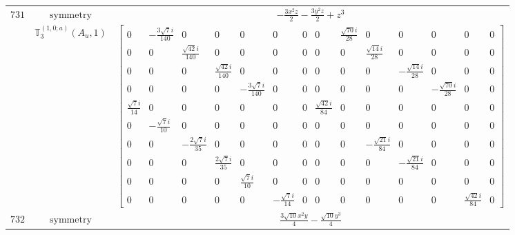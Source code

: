 \documentclass[fleqn,8pt,landscape]{jsarticle}
\begin{document}
\begin{longtable}{ccc}
$ 731 $ & $ \text{symmetry} $ & $ - \frac{3 x^{2} z}{2} - \frac{3 y^{2} z}{2} + z^{3} $ \\
$  $ & $ \mathbb{T}_{3}^{(1,0;a)}(A_{u},1) $ & $ \begin{bmatrix} 0 & - \frac{3 \sqrt{7} i}{140} & 0 & 0 & 0 & 0 & 0 & 0 & \frac{\sqrt{70} i}{28} & 0 & 0 & 0 & 0 & 0 \\ 0 & 0 & \frac{\sqrt{42} i}{140} & 0 & 0 & 0 & 0 & 0 & 0 & \frac{\sqrt{14} i}{28} & 0 & 0 & 0 & 0 \\ 0 & 0 & 0 & \frac{\sqrt{42} i}{140} & 0 & 0 & 0 & 0 & 0 & 0 & - \frac{\sqrt{14} i}{28} & 0 & 0 & 0 \\ 0 & 0 & 0 & 0 & - \frac{3 \sqrt{7} i}{140} & 0 & 0 & 0 & 0 & 0 & 0 & - \frac{\sqrt{70} i}{28} & 0 & 0 \\ \frac{\sqrt{7} i}{14} & 0 & 0 & 0 & 0 & 0 & 0 & \frac{\sqrt{42} i}{84} & 0 & 0 & 0 & 0 & 0 & 0 \\ 0 & - \frac{\sqrt{7} i}{10} & 0 & 0 & 0 & 0 & 0 & 0 & 0 & 0 & 0 & 0 & 0 & 0 \\ 0 & 0 & - \frac{2 \sqrt{7} i}{35} & 0 & 0 & 0 & 0 & 0 & 0 & - \frac{\sqrt{21} i}{84} & 0 & 0 & 0 & 0 \\ 0 & 0 & 0 & \frac{2 \sqrt{7} i}{35} & 0 & 0 & 0 & 0 & 0 & 0 & - \frac{\sqrt{21} i}{84} & 0 & 0 & 0 \\ 0 & 0 & 0 & 0 & \frac{\sqrt{7} i}{10} & 0 & 0 & 0 & 0 & 0 & 0 & 0 & 0 & 0 \\ 0 & 0 & 0 & 0 & 0 & - \frac{\sqrt{7} i}{14} & 0 & 0 & 0 & 0 & 0 & 0 & \frac{\sqrt{42} i}{84} & 0 \end{bmatrix} $ \\ \hline
$ 732 $ & $ \text{symmetry} $ & $ \frac{3 \sqrt{10} x^{2} y}{4} - \frac{\sqrt{10} y^{3}}{4} $ \\

\end{longtable}
\end{document}
